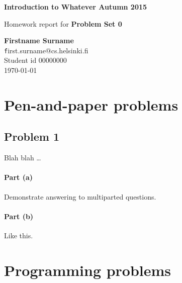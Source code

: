 \documentclass[12pt]{article}
\makeatletter
\newcommand{\Student}{Firstname Surname}
\newcommand{\StudentId}{00000000}
\newcommand{\Email}{first.surname@cs.helsinki.fi}
\newcommand{\CourseName}{Introduction to Whatever \hfill Autumn 2015}
\newcommand{\ProblemSet}{Problem Set 0}
\makeatother
\begin{document}
    \pagestyle{fancyplain}
    \fancyhf{}
    \cfoot{\thepage \, (\pageref{LastPage})}
    \renewcommand{\headrulewidth}{0pt}


    \noindent
    {\bf \CourseName}

    \noindent
    Homework report for
    {\bf \ProblemSet}

    \bigskip

    {\raggedright
        {\bf \Student} \\
        {\texttt \Email } \\
        Student id \StudentId \\
        \today
    }


    \tableofcontents

    \newpage


    \section{Pen-and-paper problems}
    \label{sec:pen_and_paper_problems}


    \subsection{Problem 1}
    \label{sub:problem_1}

    Blah blah \dots

    \paragraph{Part (a)}
    Demonstrate answering to multiparted questions.

    \paragraph{Part (b)}
    Like this.

    \section{Programming problems}
    \label{sec:programming_problems}
\end{document}
